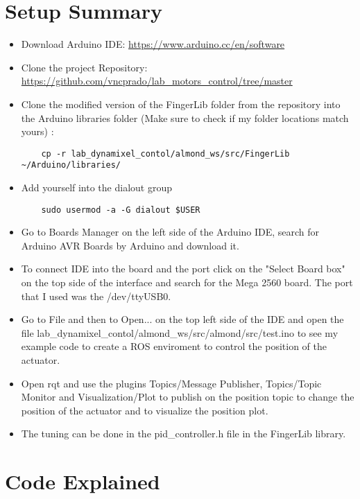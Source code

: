\documentclass{article}
\begin{document}
\section{Setup Summary}
\begin{itemize}
    \item Download Arduino IDE: \url{https://www.arduino.cc/en/software} 
    \item Clone the project Repository:  \url{https://github.com/vncprado/lab_motors_control/tree/master} 
    \item Clone the modified version of the FingerLib folder from the repository into the Arduino libraries folder (Make sure to check if my folder locations match yours) : 
    \begin{verbatim}
    cp -r lab_dynamixel_contol/almond_ws/src/FingerLib ~/Arduino/libraries/
    \end{verbatim}
    \item Add yourself into the dialout group
    \begin{verbatim}
    sudo usermod -a -G dialout $USER
    \end{verbatim}
    \item Go to Boards Manager on the left side of the Arduino IDE, search for Arduino AVR Boards by Arduino and download it.
    \item To connect IDE into the board and the port click on the "Select Board box" on the top side of the interface and search for the Mega 2560 board. The port that I used was the /dev/ttyUSB0.
    \item Go to File and then to Open... on the top left side of the IDE and open the file lab\_dynamixel\_contol/almond\_ws/src/almond/src/test.ino to see my example code to create a ROS enviroment to control the position of the actuator.
    \item Open rqt and use the plugins Topics/Message Publisher, Topics/Topic Monitor and Visualization/Plot to publish on the position topic to change the position of the actuator and to visualize the position plot.
    \item The tuning can be done in the pid\_controller.h file in the FingerLib library.

\end{itemize}

\section{Code Explained}
\end{document}
